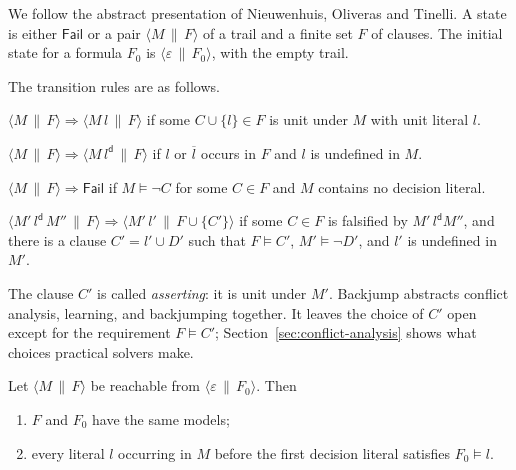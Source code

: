 We follow the abstract presentation of Nieuwenhuis, Oliveras and Tinelli. A state is either $\mathsf{Fail}$ or a pair $\langle M\,\|\,F\rangle$ of a trail and a finite set $F$ of clauses. The initial state for a formula $F_0$ is $\langle\varepsilon\,\|\,F_0\rangle$, with the empty trail.

\begin{definition}
\label{def:cdcl}
The transition rules are as follows.
\begin{description}[leftmargin=1.5em,nosep]
\item[UnitPropagate] $\langle M\,\|\,F\rangle\Rightarrow\langle M\,l\,\|\,F\rangle$ if some $C\cup\{l\}\in F$ is unit under $M$ with unit literal $l$.
\item[Decide] $\langle M\,\|\,F\rangle\Rightarrow\langle M\,l^{\mathsf d}\,\|\,F\rangle$ if $l$ or $\overline l$ occurs in $F$ and $l$ is undefined in $M$.
\item[Fail] $\langle M\,\|\,F\rangle\Rightarrow\mathsf{Fail}$ if $M\models\neg C$ for some $C\in F$ and $M$ contains no decision literal.
\item[Backjump] $\langle M'\,l^{\mathsf d}\,M''\,\|\,F\rangle\Rightarrow\langle M'\,l'\,\|\,F\cup\{C'\}\rangle$ if some $C\in F$ is falsified by $M'\,l^{\mathsf d}M''$, and there is a clause $C'=l'\cup D'$ such that $F\models C'$, $M'\models\neg D'$, and $l'$ is undefined in $M'$.
\end{description}
\end{definition}

The clause $C'$ is called \emph{asserting}: it is unit under $M'$. \textsf{Backjump} abstracts conflict analysis, learning, and backjumping together. It leaves the choice of $C'$ open except for the requirement $F\models C'$; Section~\ref{sec:conflict-analysis} shows what choices practical solvers make.

\begin{lemma}[Invariants]
\label{lem:cdcl-inv}
Let $\langle M\,\|\,F\rangle$ be reachable from $\langle\varepsilon\,\|\,F_0\rangle$. Then
\begin{enumerate}[label=(\roman*),nosep]
\item $F$ and $F_0$ have the same models;
\item every literal $l$ occurring in $M$ before the first decision literal satisfies $F_0\models l$.
\end{enumerate}
\end{lemma}

